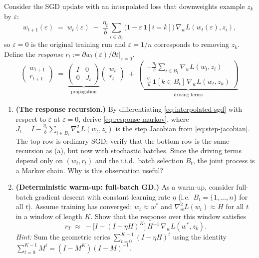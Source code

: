 \documentclass[11pt]{article}
\begin{document}
\begin{exercise}\label{ex:unroll-to-if}
Consider the SGD update with an interpolated loss that downweights example $z_k$ by $\varepsilon$:
\begin{equation}\label{eq:interpolated-sgd}
  w_{t+1}(\varepsilon) \;=\; w_t(\varepsilon) \;-\; \frac{\eta_t}{b}\sum_{i\in B_t}\bigl(1 - \varepsilon\,\mathbf{1}[i=k]\bigr)\,\nabla_w L(w_t(\varepsilon),z_i),
\end{equation}
so $\varepsilon = 0$ is the original training run and $\varepsilon = 1/n$ corresponds to removing $z_k$. Define the \emph{response} $r_t := \partial w_t(\varepsilon)/\partial\varepsilon\big|_{\varepsilon=0}$.
\begin{equation}\label{eq:response-markov}
  \begin{pmatrix} w_{t+1} \\ r_{t+1} \end{pmatrix} \;=\; \underbrace{\begin{pmatrix} I & 0 \\ 0 & J_t \end{pmatrix}}_{\text{propagation}} \begin{pmatrix} w_t \\ r_t \end{pmatrix} \;+\; \underbrace{\begin{pmatrix} -\frac{\eta_t}{b}\sum_{i\in B_t}\nabla_w L(w_t,z_i) \\[4pt] \frac{\eta_t}{b}\,\mathbf{1}[k\in B_t]\,\nabla_w L(w_t,z_k) \end{pmatrix}}_{\text{driving terms}}
\end{equation}
\begin{enumerate}
  \item[(a)] \textbf{(The response recursion.)} By differentiating \eqref{eq:interpolated-sgd} with respect to $\varepsilon$ at $\varepsilon = 0$, derive \eqref{eq:response-markov}, where $J_t = I - \frac{\eta_t}{b}\sum_{i\in B_t}\nabla_w^2 L(w_t,z_i)$ is the step Jacobian from \eqref{eq:step-jacobian}. The top row is ordinary SGD; verify that the bottom row is the same recursion as (a), but now with stochastic batches. Since the driving terms depend only on $(w_t, r_t)$ and the i.i.d.\ batch selection $B_t$, the joint process is a Markov chain. Why is this observation useful?

  \item[(b)] \textbf{(Deterministic warm-up: full-batch GD.)} As a warm-up, consider full-batch gradient descent with constant learning rate $\eta$ (i.e.\ $B_t = \{1,\dots,n\}$ for all $t$). Assume training has converged: $w_t \approx w^*$ and $\nabla_w^2 L(w_t) \approx H$ for all $t$ in a window of length $K$. Show that the response over this window satisfies
  \[
    r_T \;\approx\; -\bigl[I - (I-\eta H)^K\bigr]\,H^{-1}\,\nabla_w L(w^*,z_k).
  \]
  \emph{Hint:} Sum the geometric series $\sum_{t=0}^{K-1}(I-\eta H)^t$ using the identity $\sum_{t=0}^{K-1}M^t = (I-M^K)(I-M)^{-1}$.


\end{enumerate}
\end{exercise}
\end{document}
